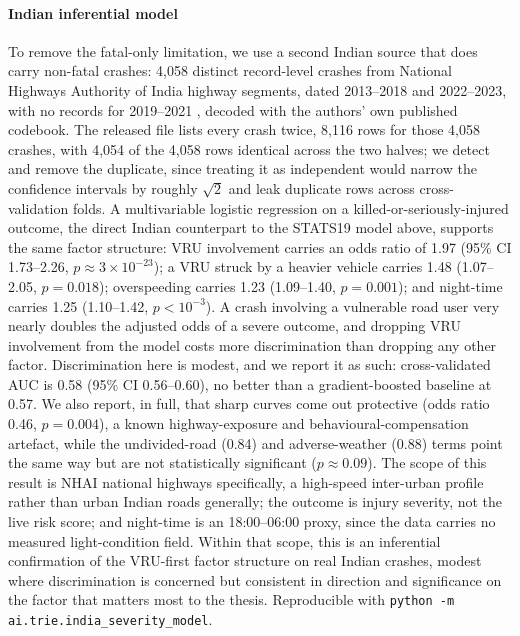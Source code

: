 \documentclass[journal]{IEEEtran}
\begin{document}
\paragraph{Indian inferential model} To remove the fatal-only limitation, we use a second Indian source that does carry non-fatal crashes: 4,058 distinct record-level crashes from National Highways Authority of India highway segments, dated 2013--2018 and 2022--2023, with no records for 2019--2021 \cite{khanum2025}, decoded with the authors' own published codebook. The released file lists every crash twice, 8,116 rows for those 4,058 crashes, with 4,054 of the 4,058 rows identical across the two halves; we detect and remove the duplicate, since treating it as independent would narrow the confidence intervals by roughly $\sqrt{2}$ and leak duplicate rows across cross-validation folds. A multivariable logistic regression on a killed-or-seriously-injured outcome, the direct Indian counterpart to the STATS19 model above, supports the same factor structure: VRU involvement carries an odds ratio of 1.97 (95\% CI 1.73--2.26, $p\approx3\times10^{-23}$); a VRU struck by a heavier vehicle carries 1.48 (1.07--2.05, $p=0.018$); overspeeding carries 1.23 (1.09--1.40, $p=0.001$); and night-time carries 1.25 (1.10--1.42, $p<10^{-3}$). A crash involving a vulnerable road user very nearly doubles the adjusted odds of a severe outcome, and dropping VRU involvement from the model costs more discrimination than dropping any other factor. Discrimination here is modest, and we report it as such: cross-validated AUC is 0.58 (95\% CI 0.56--0.60), no better than a gradient-boosted baseline at 0.57. We also report, in full, that sharp curves come out protective (odds ratio 0.46, $p=0.004$), a known highway-exposure and behavioural-compensation artefact, while the undivided-road (0.84) and adverse-weather (0.88) terms point the same way but are not statistically significant ($p\approx0.09$). The scope of this result is NHAI national highways specifically, a high-speed inter-urban profile rather than urban Indian roads generally; the outcome is injury severity, not the live risk score; and night-time is an 18:00--06:00 proxy, since the data carries no measured light-condition field. Within that scope, this is an inferential confirmation of the VRU-first factor structure on real Indian crashes, modest where discrimination is concerned but consistent in direction and significance on the factor that matters most to the thesis. Reproducible with \texttt{python -m ai.trie.india\_severity\_model}.
\end{document}
